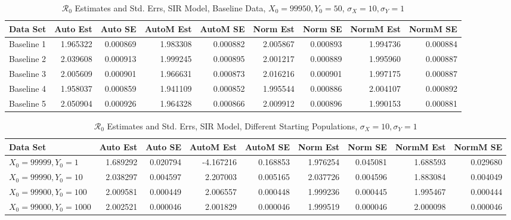 \documentclass[12pt]{article}
\newcommand{\rr}{\ensuremath{\mathcal{R}_0}}
\begin{document}
\begin{table}[H]
	\caption{$\rr$ Estimates and Std. Errs, SIR Model, 
		Baseline Data, $X_0 = 99950, Y_0 = 50$, 
		$\sigma_X = 10, \sigma_Y = 1$}
	\begin{footnotesize}
		\hskip -1cm
		\begin{tabular}{l|r|r|r|r|r|r|r|r}
			\hline
			Data Set & Auto Est & Auto SE & AutoM Est & AutoM SE & Norm Est & Norm SE & NormM Est & NormM SE\\
			\hline
			Baseline 1 & 1.965322 & 0.000869 & 1.983308 & 0.000882 & 2.005867 & 0.000893 & 1.994736 & 0.000884\\
			\hline
			Baseline 2 & 2.039608 & 0.000913 & 1.999245 & 0.000895 & 2.001217 & 0.000889 & 1.995960 & 0.000887\\
			\hline
			Baseline 3 & 2.005609 & 0.000901 & 1.966631 & 0.000873 & 2.016216 & 0.000901 & 1.997175 & 0.000887\\
			\hline
			Baseline 4 & 1.958037 & 0.000859 & 1.941109 & 0.000852 & 1.995544 & 0.000886 & 2.004107 & 0.000892\\
			\hline
			Baseline 5 & 2.050904 & 0.000926 & 1.964328 & 0.000866 & 2.009912 & 0.000896 & 1.990153 & 0.000881\\
			\hline
		\end{tabular}
	\end{footnotesize}
\end{table}


\begin{table}[H]
	
	\caption{$\rr$ Estimates and Std. Errs, SIR Model,
		Different Starting Populations, 
		$\sigma_X = 10, \sigma_Y = 1$}
	\begin{footnotesize}
		\hskip -1.7cm
		\begin{tabular}{l|r|r|r|r|r|r|r|r}
			\hline
			Data Set & Auto Est & Auto SE & AutoM Est & AutoM SE & Norm Est & Norm SE & NormM Est & NormM SE\\
			\hline
			$X_0 = 99999, Y_0 = 1$ & 1.689292 & 0.020794 & -4.167216 & 0.168853 & 1.976254 & 0.045081 & 1.688593 & 0.029680\\
			\hline
			$X_0 = 99990, Y_0 = 10$ & 2.038297 & 0.004597 & 2.207003 & 0.005165 & 2.037726 & 0.004596 & 1.883084 & 0.004049\\
			\hline
			$X_0 = 99900, Y_0 = 100$ & 2.009581 & 0.000449 & 2.006557 & 0.000448 & 1.999236 & 0.000445 & 1.995467 & 0.000444\\
			\hline
			$X_0 = 99000, Y_0 = 1000$ & 2.002521 & 0.000046 & 2.001829 & 0.000046 & 1.999519 & 0.000046 & 2.000098 & 0.000046\\
			\hline
		\end{tabular}
	\end{footnotesize}
\end{table}
\end{document}
